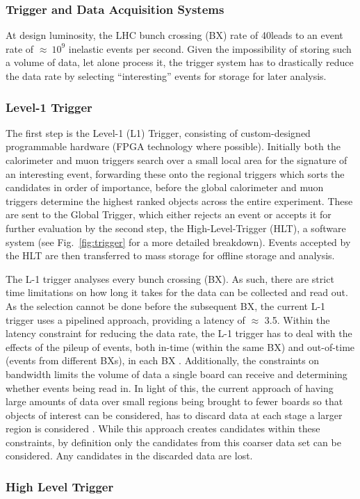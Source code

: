\subsubsection{Trigger and Data Acquisition Systems}
At design luminosity, the LHC bunch crossing (BX) rate of 40\MHz leads to an event rate of $\approx~10^{9}$ inelastic events per second.
Given the impossibility of storing such a volume of data, let alone process it, the trigger system has to drastically reduce the data rate by selecting ``interesting'' events for storage for later analysis.


\subsubsection{Level-1 Trigger}
The first step is the Level-1 (L1) Trigger, consisting of custom-designed programmable hardware (FPGA technology where possible). 
Initially both the calorimeter and muon triggers search over a small local area for the signature of an interesting event, forwarding these onto the regional triggers which sorts the candidates in order of importance, before the global calorimeter and muon triggers determine the highest ranked objects across the entire experiment. 
These are sent to the Global Trigger, which either rejects an event or accepts it for further evaluation by the second step, the High-Level-Trigger (HLT), a software system (see Fig.~\ref{fig:trigger} for a more detailed breakdown). 
Events accepted by the HLT are then transferred to mass storage for offline storage and analysis\cite{oldcms}. 

The L-1 trigger analyses every bunch crossing (BX). 
As such, there are strict time limitations on how long it takes for the data can be collected and read out. 
As the selection cannot be done before the subsequent BX, the current L-1 trigger uses a pipelined approach, providing a latency of $\approx$ 3.5\mus . 
Within the latency constraint for reducing the data rate, the L-1 trigger has to deal with the effects of the pileup of events, both in-time (within the same BX) and out-of-time (events from different BXs), in each BX . 
Additionally, the constraints on bandwidth limits the volume of data a single board can receive and determining whether events being read in. 
In light of this, the current approach of having large amounts of data over small regions being brought to fewer boards so that objects of interest can be considered, has to discard data at each stage a larger region is considered . 
While this approach creates candidates within these constraints, by definition only the candidates from this coarser data set can be considered. 
Any candidates in the discarded data are lost\cite{oldcms}.

\subsubsection{High Level Trigger}
